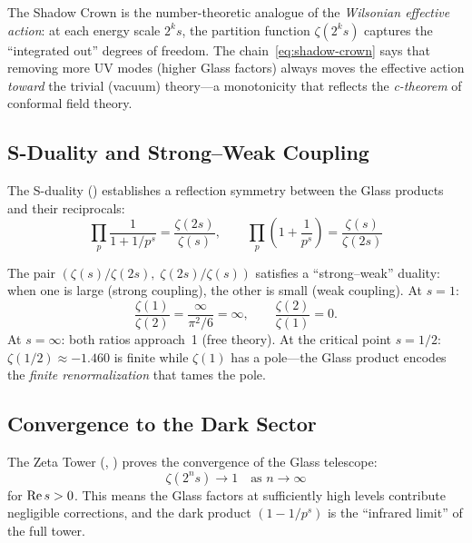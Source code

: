 \begin{principle}
The Shadow Crown is the number-theoretic analogue of the
\emph{Wilsonian effective action}: at each energy scale $2^k s$,
the partition function $\zeta(2^k s)$ captures the ``integrated out''
degrees of freedom. The chain~\eqref{eq:shadow-crown} says that
removing more UV modes (higher Glass factors) always moves the
effective action \emph{toward} the trivial (vacuum) theory---a
monotonicity that reflects the \emph{c-theorem} of conformal
field theory.
\end{principle}

\subsection{S-Duality and Strong--Weak Coupling}

The S-duality () establishes a reflection
symmetry between the Glass products and their reciprocals:
\begin{equation}
  \prod_p \frac{1}{1 + 1/p^s} = \frac{\zeta(2s)}{\zeta(s)},
  \qquad
  \prod_p \left(1 + \frac{1}{p^s}\right) = \frac{\zeta(s)}{\zeta(2s)}
  \label{eq:s-duality}
\end{equation}

\begin{correspondence}[S-Duality]
The pair $(\zeta(s)/\zeta(2s),\; \zeta(2s)/\zeta(s))$ satisfies
a ``strong--weak'' duality: when one is large (strong coupling),
the other is small (weak coupling). At $s = 1$:
\[
  \frac{\zeta(1)}{\zeta(2)} = \frac{\infty}{\pi^2/6} = \infty,
  \qquad
  \frac{\zeta(2)}{\zeta(1)} = 0.
\]
At $s = \infty$: both ratios approach~1 (free theory). At the
critical point $s = 1/2$: $\zeta(1/2) \approx -1.460$ is finite
while $\zeta(1)$ has a pole---the Glass product encodes the
\emph{finite renormalization} that tames the pole.
\end{correspondence}

\subsection{Convergence to the Dark Sector}

The Zeta Tower (,
) proves the convergence of
the Glass telescope:
\begin{equation}
  \zeta(2^n s) \to 1 \quad\text{as } n \to \infty
  \label{eq:tower-limit}
\end{equation}
for $\operatorname{Re} s > 0$. This means the Glass factors at sufficiently high
levels contribute negligible corrections, and the dark
product $(1 - 1/p^s)$ is the ``infrared limit'' of the full tower.

